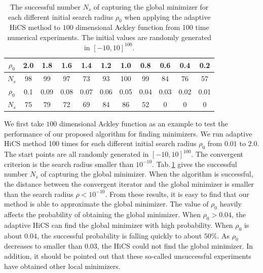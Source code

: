 \begin{table}[!hbpt]
\caption{
The successful number $N_s$ of capturing the global minimizer for
each different initial search radius $\rho_0$ when applying the
adaptive HiCS method to $100$ dimensional Ackley function from 100
time numerical experiments. 
The initial values are randomly generated in $[-10,10]^{100}$.
}
\label{tab:ackley100D:AHiCS}
\begin{center}
\begin{tabular}{|c|c|c|c|c|c|c|c|c|c|c|}
 \hline
  $\rho_0$  & 2.0 & 1.8 & 1.6 & 1.4 & 1.2 & 1.0 & 0.8 & 0.6 & 0.4 & 0.2 
 \\\hline
  $N_s$     & 98  & 99  & 97  & 73  & 93  & 100 & 99  & 84  & 76 & 57 
\\\hline \hline
 $\rho_0$ & 0.1 & 0.09 & 0.08 & 0.07 & 0.06 & 0.05 & 0.04 & 0.03& 0.02 & 0.01
 \\\hline
  $N_s$& 75 & 79 & 72 & 69 & 84 &86 & 52 & 0 & 0 & 0
\\ \hline
\end{tabular}
\end{center}
\end{table}
We first take $100$ dimensional Ackley function as an example to
test the performance of our proposed algorithm for finding minimizers. 
We run adaptive HiCS method 100 times for each different initial
search radius $\rho_0$ from $0.01$ to $2.0$.
The start points are all randomly generated in $[-10,10]^{100}$.
The convergent criterion is the search radius smaller than $10^{-10}$.
Tab.\,\ref{tab:ackley100D:AHiCS} gives the successful number
$N_s$ of capturing the global minimizer.  
When the algorithm is successful, the distance between the
convergent iterator and the global minimizer is smaller than the
search radius $\rho < 10^{-10}$.
From these results, it is easy to find that our method is able to
approximate the global minimizer. 
The value of $\rho_0$ heavily affects the probability of
obtaining the global minimizer. 
When $\rho_0 > 0.04$, the adaptive HiCS can find the global
minimizer with high probability. 
When $\rho_0$ is about $0.04$, 
the successful probability is falling quickly to about $50\%$. 
As $\rho_0$ decreases to smaller than $0.03$, the HiCS could not
find the global minimizer.
In addition, it should be pointed out that these so-called unsuccessful
experiments have obtained other local minimizers. 



